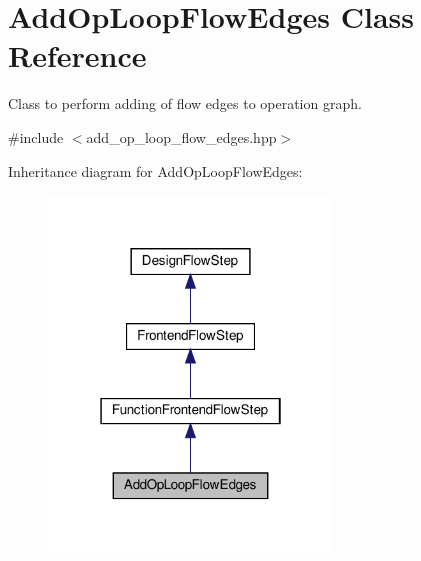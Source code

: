 \hypertarget{classAddOpLoopFlowEdges}{}\section{Add\+Op\+Loop\+Flow\+Edges Class Reference}
\label{classAddOpLoopFlowEdges}


Class to perform adding of flow edges to operation graph.  




{\ttfamily \#include $<$add\+\_\+op\+\_\+loop\+\_\+flow\+\_\+edges.\+hpp$>$}



Inheritance diagram for Add\+Op\+Loop\+Flow\+Edges\+:
\nopagebreak
\begin{figure}[H]
\begin{center}
\leavevmode
\includegraphics[width=214pt]{d2/dd3/classAddOpLoopFlowEdges__inherit__graph}
\end{center}
\end{figure}


